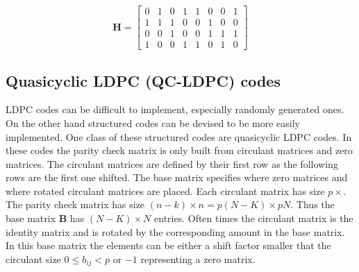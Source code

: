 \begin{equation}
	\bm{H} = \left[\begin{matrix}
		0 & 1 & 0 & 1 & 1 & 0 & 0 & 1 \\ 
		1 & 1 & 1 & 0 & 0 & 1 & 0 & 0 \\
		0 & 0 & 1 & 0 & 0 & 1 & 1 & 1 \\
		1 & 0 & 0 & 1 & 1 & 0 & 1 & 0
	\end{matrix}\right] \label{ldpc_mat}
\end{equation}

\subsection{Quasicyclic LDPC (QC-LDPC) codes} \label{qc_ldpc}
LDPC codes can be difficult to implement, especially randomly generated ones. On the other hand structured codes can be devised to be more easily implemented. One class of these structured codes are quasicyclic LDPC codes. In these codes the parity check matrix is only built from circulant matrices and zero matrices\cite{Fo04}. The circulant matrices are defined by their first row as the following rows are the first one shifted. The base matrix specifies where zero matrices and where rotated circulant matrices are placed. Each circulant matrix has size $p\times$. The parity check matrix has size $(n-k) \times n = p (N - K) \times p N$. Thus the base matrix $\bm{B}$ has $(N - K) \times N$ entries. Often times the circulant matrix is the identity matrix and is rotated by the corresponding amount in the base matrix. In this base matrix the elements can be either a shift factor smaller that the circulant size $0 \leq b_{ij} < p$ or $-1$ representing a zero matrix.

